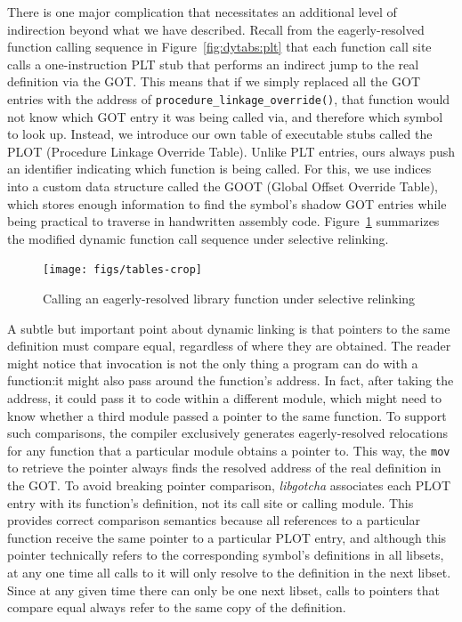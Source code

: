There is one major complication that necessitates an additional level of indirection
beyond what we have described.  Recall from the eagerly-resolved function calling
sequence in Figure~\ref{fig:dytabs:plt} that each function call site calls a
one-instruction PLT stub that performs an indirect jump to the real definition via
the GOT.  This means that if we simply replaced all the GOT entries with the address
of \texttt{procedure\_linkage\_override()}, that function would not know which GOT
entry it was being called via, and therefore which symbol to look up.  Instead, we
introduce our own table of executable stubs called the PLOT (Procedure Linkage
Override Table).  Unlike PLT entries, ours always push an identifier indicating which
function is being called.  For this, we use indices into a custom data structure
called the GOOT (Global Offset Override Table), which stores enough information to
find the symbol's shadow GOT entries while being practical to traverse in handwritten
assembly code.  Figure~\ref{fig:override} summarizes the modified dynamic function
call sequence under selective relinking.

\begin{figure}
\texttt{[image: figs/tables-crop]}
\caption{Calling an eagerly-resolved library function under selective relinking}
\label{fig:override}
\end{figure}

A subtle but important point about dynamic linking is that pointers to the same
definition must compare equal, regardless of where they are obtained.
The reader might notice that invocation is not the only thing a program can do with a
function:\@ it might also pass around the function's address.  In fact, after taking
the address, it could pass it to code within a different module, which might need to
know whether a third module passed a pointer to the same function.  To support such
comparisons, the compiler exclusively generates eagerly-resolved relocations for any
function that a particular module obtains a pointer to.  This way, the \texttt{mov}
to retrieve the pointer always finds the resolved address of the real definition in
the GOT.  To avoid breaking pointer comparison, \textit{libgotcha} associates each
PLOT entry with its function's definition, not its call site or calling module.  This
provides correct comparison semantics because all references to a particular function
receive the same pointer to a particular PLOT entry, and although this pointer
technically refers to the corresponding symbol's definitions in all libsets, at any
one time all calls to it will only resolve to the definition in the next libset.
Since at any given time there can only be one next libset, calls to pointers that
compare equal always refer to the same copy of the definition.

